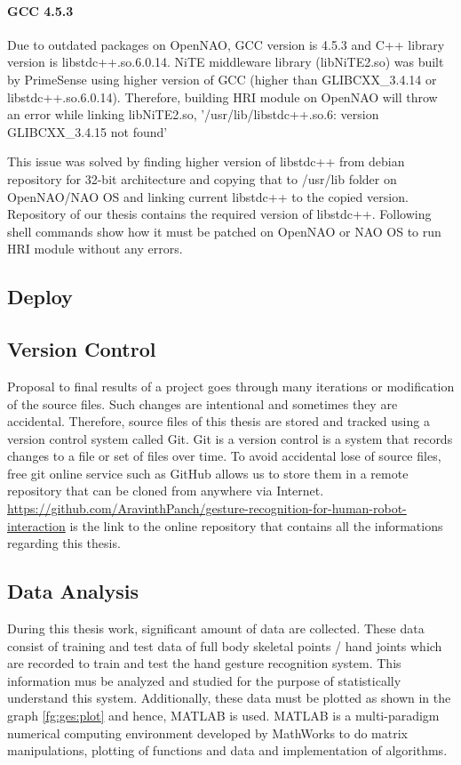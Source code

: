 \paragraph*{GCC 4.5.3} Due to outdated packages on OpenNAO, GCC version is 4.5.3 and C++ library version is libstdc++.so.6.0.14. NiTE middleware library (libNiTE2.so) was built by PrimeSense using higher version of GCC (higher than GLIBCXX\_3.4.14 or libstdc++.so.6.0.14). Therefore, building HRI module on OpenNAO will throw an error while linking libNiTE2.so, '/usr/lib/libstdc++.so.6: version GLIBCXX\_3.4.15 not found'

This issue was solved by finding higher version of libstdc++ from debian repository for 32-bit architecture and copying that to /usr/lib folder on OpenNAO/NAO OS and linking current libstdc++ to the copied version. Repository of our thesis contains the required version of libstdc++. Following shell commands show how it must be patched on OpenNAO or NAO OS to run HRI module without any errors.



\subsection{Deploy}

\subsection{Version Control} Proposal to final results of a project goes through many iterations or modification of the source files. Such changes are intentional and sometimes they are accidental. Therefore, source files of this thesis are stored and tracked using a version control system called Git. Git is a version control is a system that records changes to a file or set of files over time. To avoid accidental lose of source files, free git online service such as GitHub allows us to store them in a remote repository that can be cloned from anywhere via Internet. \url{https://github.com/AravinthPanch/gesture-recognition-for-human-robot-interaction} is the link to the online repository that contains all the informations regarding this thesis.

\subsection{Data Analysis} During this thesis work, significant amount of data are collected. These data consist of training and test data of full body skeletal points / hand joints which are recorded to train and test the hand gesture recognition system. This information mus be analyzed and studied for the purpose of statistically understand this system. Additionally, these data must be plotted as shown in the graph \ref{fg:ges:plot} and hence, MATLAB is used. MATLAB is a multi-paradigm numerical computing environment developed by MathWorks to do matrix manipulations, plotting of functions and data and implementation of algorithms. 

